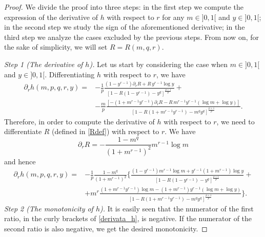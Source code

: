 \documentclass{amsart}
\theoremstyle{definition}
\theoremstyle{remark}
\newcommand{\de}{\partial}
\begin{document}
\begin{proof} We divide the proof into three steps: in the first step we compute the expression of the derivative of $h$ with respect to $r$ for any $m\in]0,1[$ and $y\in]0,1[$; in the second step we study the sign of the aforementioned derivative; in the third step we analyze the cases excluded by the previous steps. From now on, for the sake of simplicity, we will set  $R=R(m,q,r)$.

{\it Step 1 (The derivative of $h$).} Let us start by considering the case when $m\in]0,1[$ and $y\in]0,1[$.
Differentiating $h$ with respect to $r$, we have
\begin{equation*}
\begin{split}
\de_{r}h (m,p,q,r,y)= &- \frac 1 p \frac {(1-y^{r-1})\de_{r} R + R\, y^{r-1}\log y}{\left[1-R(1- y^{r-1}) - y^q\right]^\frac{p+1}p} +\\[.2cm]
&- \frac m p \frac{
[-(1+m^{r-1}y^{r-1})\de_{r}R- R\,m^{r-1}y^{r-1}(\log m +\log y)]}{ \left[1-R(1+m^{r-1}y^{r-1})-m^{q}y^{q}\right]^\frac {p+1} p}.
\end{split}
\end{equation*}
Therefore, in order to compute the derivative of $h$ with respect to $r$, we need to differentiate $R$ (defined in \eqref{Rdef}) with respect to $r$. We have
\[
\de_{r}R= -\frac{1-m^{q}}{(1+m^{r-1})^{2}}m^{r-1}\log m
\]
and hence
\begin{equation}
\begin{split}
\label{derivata_h}
\de_{r}h (m,p,q,r,y)= &-\frac1p\frac{1-m^{q}}{(1+m^{r-1})^{2}}\bigg\{\frac{ (1-y^{r-1})m^{r-1}\log m +y^{r-1}(1+m^{r-1})\log y}{\left[1-R(1- y^{r-1}) - y^q\right]^\frac{p+1}p}+ \\[.3cm]
& +m^r \frac{(1+m^{r-1}y^{r-1})\log m-(1+m^{r-1})y^{r-1}(\log m +\log y)}{ \left[1-R(1+m^{r-1}y^{r-1})-m^{q}y^{q}\right]^\frac {p+1} p}\bigg\}.
\end{split}
\end{equation}
{\it Step 2 (The monotonicity of $h$).}
It is easily seen that the numerator of the first ratio, in the curly brackets of \eqref{derivata_h}, is negative. If the numerator of the second ratio is also negative, we get the desired monotonicity. %

\end{proof}
\end{document}
